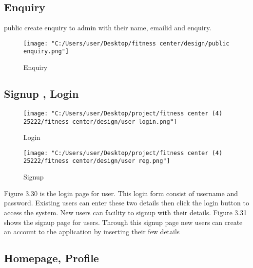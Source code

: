 \documentclass[a4paper,12pt,toc=flat]{report}
\begin{document}
{{	\subsection{Enquiry}
	 \hspace*{12pt} public create enquiry to admin with their name, emailid and enquiry.
	\begin{figure}[bph]
		\begin{center}
			\texttt{[image: "C:/Users/user/Desktop/fitness center/design/public enquiry.png"]}
		\end{center}
		\caption{Enquiry}
	\end{figure}	
	\pagebreak		
	
	\subsection{Signup , Login}

	
	\begin{figure}[!ht]
		\begin{minipage}{0.45\linewidth}
			\texttt{[image: "C:/Users/user/Desktop/project/fitness center (4) 25222/fitness center/design/user login.png"]}
			\caption{Login}
		\end{minipage}
		\hfill
		\begin{minipage}{0.45\linewidth}
			\texttt{[image: "C:/Users/user/Desktop/project/fitness center (4) 25222/fitness center/design/user reg.png"]}
			\caption{ Signup}
		\end{minipage}
	\end{figure}
	 \hspace*{12pt}Figure 3.30 is the login page for user. This login form consist of username and password. Existing users can enter these two details then click the login button to access the system. New users can facility to signup with their details. Figure 3.31 shows the signup page for users. Through this signup page new users can create an account to the application by inserting their few details
	\pagebreak
	\subsection{Homepage, Profile}
	
}}
\end{document}
